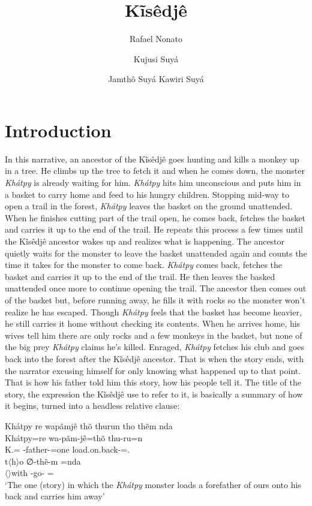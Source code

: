\documentclass[output=paper,
modfonts,nonflat
]{langsci/langscibook}
\author{Rafael Nonato\affiliation{UMass Amherst, USA}%
\and Kujusi Suyá%
\and Jamthô Suyá%
\lastand Kawiri Suyá%
}%
\title{Kĩsêdjê}
\begin{document}
\section{Introduction} %

In this narrative, an ancestor of the Kĩsêdjê goes hunting and kills a monkey
up in a tree. He climbs up the tree to fetch it and when he comes down, the
monster \textit{Khátpy} is already waiting for him. \textit{Khátpy} hits him unconscious and puts
him in a basket to carry home and feed to his hungry children. Stopping mid-way to
open a trail in the forest, \textit{Khátpy} leaves the basket on the ground unattended.
When he finishes cutting part of the trail open, he comes back, fetches the
basket and carries it up to the end of the trail. He repeats this process a few
times until the Kĩsêdjê ancestor wakes up and realizes what is happening. The
ancestor quietly waits for the monster to leave the basket unattended again and
counts the time it takes for the monster to come back. \textit{Khátpy} comes back,
fetches the basket and carries it up to the end of the trail. He then leaves
the basked unattended once more to continue opening the trail. The ancestor
then comes out of the basket but, before running away, he fills it with rocks
so the monster won't realize he has escaped. Though \textit{Khátpy} feels that the
basket has become heavier, he still carries it home without checking its
contents. When he arrives home, his wives tell him there are only rocks and a
few monkeys in the basket, but none of the big prey \textit{Khátpy} claims he's killed.
Enraged, \textit{Khátpy} fetches his club and goes back into the forest after the
Kĩsêdjê ancestor. That is when the story ends, with the narrator excusing
himself for only knowing what happened up to that point. That is how his father
told him this story, how his people tell it. The title of the story, the
expression the Kĩsêdjê use to refer to it, is basically a summary of how it
begins, turned into a headless relative clause:

\ea Khátpy re wapãmjê thõ thurun tho thẽm nda \\[.3em]
\gll {\ob}  Khátpy=re wa-pãm-jê=thõ              thu-ru=n                       \\
     {} K.=\Erg{} \First\Incl-father-\Pl=one load.on.back-\Nmlz=\AAnd.\Ss{} \\
\gll t$\langle$h$\rangle$o        ∅-thẽ-m           {\cb}=nda   \\ 
     $\langle$\Third$\rangle$with \Third-go-\Nmlz{} {}=\Def \\ 
\glt `The one (story) in which the \textit{Khátpy} monster loads a forefather of ours onto his back and carries him away'%
\label{exe:title}
\z
\end{document}

